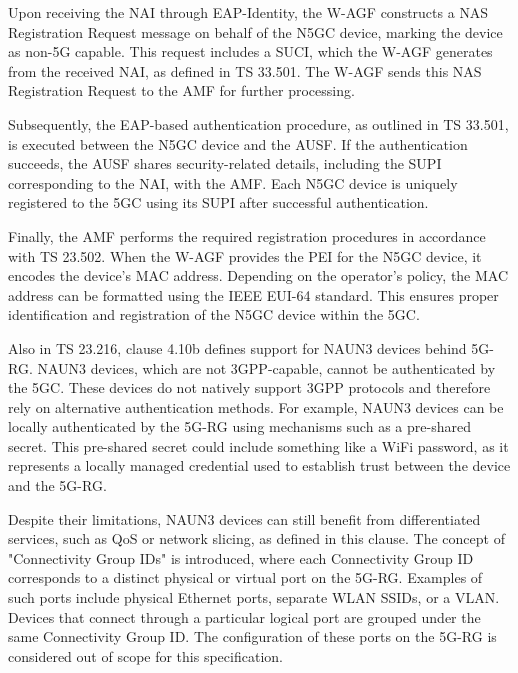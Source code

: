 Upon receiving the \ac{NAI} through \ac{EAP}-Identity, the \ac{W-AGF} constructs a \ac{NAS} Registration Request message on behalf of the \ac{N5GC} device, marking the device as non-\ac{5G} capable. This request includes a \ac{SUCI}, which the \ac{W-AGF} generates from the received \ac{NAI}, as defined in \ac{TS} 33.501. The \ac{W-AGF} sends this \ac{NAS} Registration Request to the \ac{AMF} for further processing.

Subsequently, the \ac{EAP}-based authentication procedure, as outlined in \ac{TS} 33.501, is executed between the \ac{N5GC} device and the \ac{AUSF}. If the authentication succeeds, the \ac{AUSF} shares security-related details, including the \ac{SUPI} corresponding to the \ac{NAI}, with the \ac{AMF}. Each \ac{N5GC} device is uniquely registered to the \ac{5GC} using its \ac{SUPI} after successful authentication.

Finally, the \ac{AMF} performs the required registration procedures in accordance with \ac{TS} 23.502. When the \ac{W-AGF} provides the \ac{PEI} for the \ac{N5GC} device, it encodes the device's \ac{MAC} address. Depending on the operator's policy, the \ac{MAC} address can be formatted using the \ac{IEEE} \ac{EUI}-64 standard. This ensures proper identification and registration of the \ac{N5GC} device within the \ac{5GC}.

Also in TS 23.216, clause 4.10b defines support for \ac{NAUN3} devices behind \ac{5G-RG}. \ac{NAUN3} devices, which are not \ac{3GPP}-capable, cannot be authenticated by the \ac{5GC}. These devices do not natively support \ac{3GPP} protocols and therefore rely on alternative authentication methods. For example, \ac{NAUN3} devices can be locally authenticated by the \ac{5G-RG} using mechanisms such as a pre-shared secret. This pre-shared secret could include something like a WiFi password, as it represents a locally managed credential used to establish trust between the device and the \ac{5G-RG}.

Despite their limitations, \ac{NAUN3} devices can still benefit from differentiated services, such as \ac{QoS} or network slicing, as defined in this clause. The concept of "Connectivity Group IDs" is introduced, where each \ac{Connectivity Group ID} corresponds to a distinct physical or virtual port on the \ac{5G-RG}. Examples of such ports include physical Ethernet ports, separate \ac{WLAN} \ac{SSID}s, or a \ac{VLAN}. Devices that connect through a particular logical port are grouped under the same \ac{Connectivity Group ID}. The configuration of these ports on the \ac{5G-RG} is considered out of scope for this specification.

